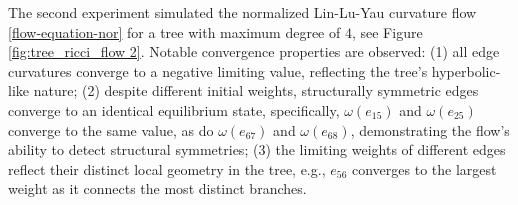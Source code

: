 \documentclass{article}
\begin{document}
The second experiment simulated the normalized Lin-Lu-Yau curvature flow \eqref{flow-equation-nor} for a tree with maximum degree of $4$, see Figure \ref{fig:tree_ricci_flow 2}. Notable convergence properties are observed: (1) all edge curvatures converge to a negative limiting value, reflecting the tree's hyperbolic-like nature; (2) despite different initial weights, structurally symmetric edges converge to an identical equilibrium state,  specifically, $\omega(e_{15})$ and $\omega(e_{25})$ converge to the same value, as do $\omega(e_{67})$ and $\omega(e_{68})$, demonstrating the flow's ability to detect structural symmetries; (3) the limiting weights of different edges reflect their distinct local geometry in the tree, e.g., $e_{56}$ converges to the largest weight as it connects the most distinct branches.
\begin{figure}[H]
  \centering


\end{figure}
\end{document}
